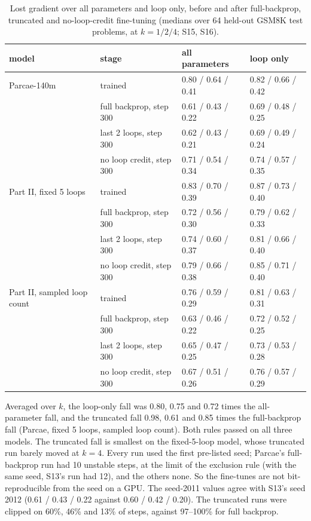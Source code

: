 \documentclass[10pt]{article}
\begin{document}
\begin{table}[!htbp]
\centering\small
\caption{Lost gradient over all parameters and loop only, before and after full-backprop, truncated and no-loop-credit fine-tuning (medians over 64 held-out GSM8K test problems, at $k = 1 / 2 / 4$; S15, S16).}
\begin{tabular}{llll}
\toprule
model & stage & all parameters & loop only \\
\midrule
Parcae-140m & trained & 0.80 / 0.64 / 0.41 & 0.82 / 0.66 / 0.42 \\
 & full backprop, step 300 & 0.61 / 0.43 / 0.22 & 0.69 / 0.48 / 0.25 \\
 & last 2 loops, step 300 & 0.62 / 0.43 / 0.21 & 0.69 / 0.49 / 0.24 \\
 & no loop credit, step 300 & 0.71 / 0.54 / 0.34 & 0.74 / 0.57 / 0.35 \\
Part II, fixed 5 loops & trained & 0.83 / 0.70 / 0.39 & 0.87 / 0.73 / 0.40 \\
 & full backprop, step 300 & 0.72 / 0.56 / 0.30 & 0.79 / 0.62 / 0.33 \\
 & last 2 loops, step 300 & 0.74 / 0.60 / 0.37 & 0.81 / 0.66 / 0.40 \\
 & no loop credit, step 300 & 0.79 / 0.66 / 0.38 & 0.85 / 0.71 / 0.40 \\
Part II, sampled loop count & trained & 0.76 / 0.59 / 0.29 & 0.81 / 0.63 / 0.31 \\
 & full backprop, step 300 & 0.63 / 0.46 / 0.22 & 0.72 / 0.52 / 0.25 \\
 & last 2 loops, step 300 & 0.65 / 0.47 / 0.25 & 0.73 / 0.53 / 0.28 \\
 & no loop credit, step 300 & 0.67 / 0.51 / 0.26 & 0.76 / 0.57 / 0.29 \\
\bottomrule
\end{tabular}
\label{tab:11}
\end{table}


Averaged over $k$, the loop-only fall was 0.80, 0.75 and 0.72 times the all-parameter fall, and the truncated fall 0.98, 0.61 and 0.85 times the full-backprop fall (Parcae, fixed 5 loops, sampled loop count). Both rules passed on all three models. The truncated fall is smallest on the fixed-5-loop model, whose truncated run barely moved at $k = 4$. Every run used the first pre-listed seed; Parcae's full-backprop run had 10 unstable steps, at the limit of the exclusion rule (with the same seed, S13's run had 12), and the others none. So the fine-tunes are not bit-reproducible from the seed on a GPU. The seed-2011 values agree with S13's seed 2012 (0.61 / 0.43 / 0.22 against 0.60 / 0.42 / 0.20). The truncated runs were clipped on 60\%, 46\% and 13\% of steps, against 97--100\% for full backprop.
\end{document}
